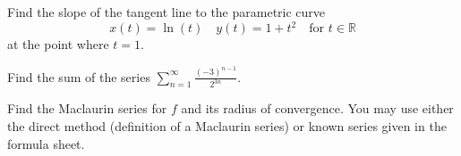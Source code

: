 \documentclass[12pt, addpoints]{exam/exam}
\newcommand{\1}{^{-1}}
\newcommand{\R}{\mathbb R}
\theoremstyle{plain}
\begin{document}
\begin{questions}


\question[7]%
Find the slope of the tangent line to the parametric curve
\[
x(t)=\ln(t) \quad y(t)=1+t^2\quad \text{for }t\in\R
\]	
at the point where $t=1$.
\vspace{20pc}

\question[10]%
Find the sum of the series $\sum_{n=1}^{\infty}\frac{(-3)^{n-1}}{2^{3n}}$.


\newpage
\question Find the Maclaurin series for $f$ and its radius of convergence.  You may use either the direct method (definition of a Maclaurin series) or known series given in the formula sheet.


\end{questions}
\end{document}
